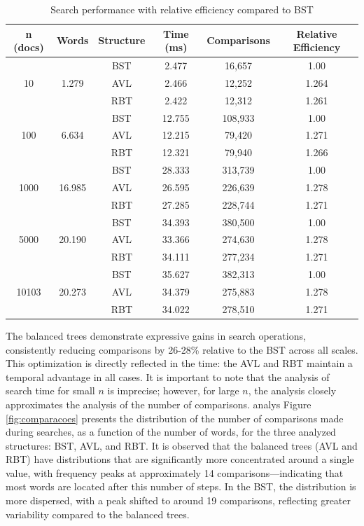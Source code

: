  \begin{table}[H]
     \centering
     \begin{tabular}{|c|c|c|c|c|c|}
     \hline
     \textbf{n (docs)} & \textbf{Words} & \textbf{Structure} & \textbf{Time (ms)} & \textbf{Comparisons} & \textbf{Relative Efficiency} \\
     \hline
     \multirow{3}{*}{10} & \multirow{3}{*}{1.279} & BST & 2.477 & 16,657 & 1.00 \\
     & & AVL & 2.466 & 12,252 & 1.264 \\
     & & RBT & 2.422 & 12,312 & 1.261 \\
     \hline
     \multirow{3}{*}{100} & \multirow{3}{*}{6.634} & BST & 12.755 & 108,933 & 1.00 \\
     & & AVL & 12.215 & 79,420 & 1.271 \\
     & & RBT & 12.321 & 79,940 & 1.266 \\
     \hline
     \multirow{3}{*}{1000} & \multirow{3}{*}{16.985} & BST & 28.333 & 313,739 & 1.00 \\
     & & AVL & 26.595 & 226,639 & 1.278 \\
     & & RBT & 27.285 & 228,744 & 1.271 \\
     \hline
     \multirow{3}{*}{5000} & \multirow{3}{*}{20.190} & BST & 34.393 & 380,500 & 1.00 \\
     & & AVL & 33.366 & 274,630 & 1.278 \\
     & & RBT & 34.111 & 277,234 & 1.271 \\
     \hline
     \multirow{3}{*}{10103} & \multirow{3}{*}{20.273} & BST & 35.627 & 382,313 & 1.00 \\
     & & AVL & 34.379 & 275,883 & 1.278 \\
     & & RBT & 34.022 & 278,510 & 1.271 \\
     \hline
     \end{tabular}
     \caption{Search performance with relative efficiency compared to BST}
     \label{tab:busca_completa}
 \end{table}


 The balanced trees demonstrate expressive gains in search operations, consistently reducing
 comparisons by 26-28\% relative to the BST across all scales. This optimization is directly reflected in the time:
 the AVL and RBT maintain a temporal advantage in all cases. It is important to note that the analysis of search time for small
 $n$ is imprecise; however, for large $n$, the analysis closely approximates the analysis of the number of comparisons.
analys
 Figure \ref{fig:comparacoes} presents the distribution of the number of comparisons made
 during searches, as a function of the number of words, for the three analyzed structures:
 BST, AVL, and RBT. It is observed that the balanced trees (AVL and RBT) have distributions
 that are significantly more concentrated around a single value, with frequency peaks at
 approximately 14 comparisons—indicating that most words are located after this
 number of steps. In the BST, the distribution is more dispersed, with a peak
 shifted to around 19 comparisons, reflecting greater variability compared to the balanced trees.

